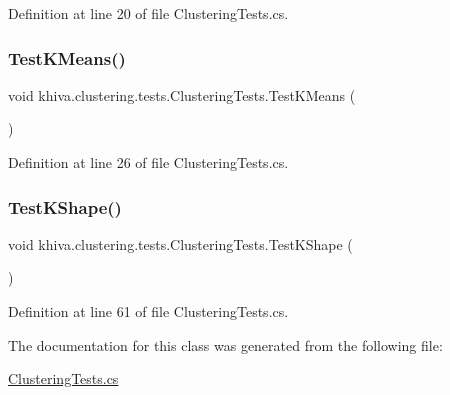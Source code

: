 Definition at line 20 of file Clustering\+Tests.\+cs.

\mbox{\label{classkhiva_1_1clustering_1_1tests_1_1_clustering_tests_a2135ab26c9481d3f04140e74520b6e93}} 
\subsubsection{\texorpdfstring{Test\+K\+Means()}{TestKMeans()}}
{\footnotesize\ttfamily void khiva.\+clustering.\+tests.\+Clustering\+Tests.\+Test\+K\+Means (\begin{DoxyParamCaption}{ }\end{DoxyParamCaption})\hspace{0.3cm}{\ttfamily [inline]}}



Definition at line 26 of file Clustering\+Tests.\+cs.

\mbox{\label{classkhiva_1_1clustering_1_1tests_1_1_clustering_tests_a10c280e15c599f833cd9b3b7b006edb9}} 
\subsubsection{\texorpdfstring{Test\+K\+Shape()}{TestKShape()}}
{\footnotesize\ttfamily void khiva.\+clustering.\+tests.\+Clustering\+Tests.\+Test\+K\+Shape (\begin{DoxyParamCaption}{ }\end{DoxyParamCaption})\hspace{0.3cm}{\ttfamily [inline]}}



Definition at line 61 of file Clustering\+Tests.\+cs.



The documentation for this class was generated from the following file\+:\begin{DoxyCompactItemize}
\item 
\mbox{\hyperlink{_clustering_tests_8cs}{Clustering\+Tests.\+cs}}\end{DoxyCompactItemize}
